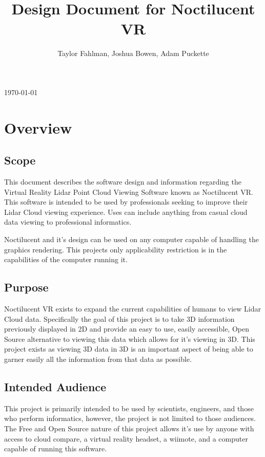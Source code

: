 \documentclass{article}
\begin{document}
\title {Design Document for Noctilucent VR}
\author {Taylor Fahlman, Joshua Bowen, Adam Puckette}
\today

\maketitle

\abstract

\newpage
\thispagestyle{empty}

\tableofcontents

\newpage
\thispagestyle{empty}
\mbox{}

\section{Overview}
\subsection{Scope}

This document describes the software design and information regarding the Virtual Reality Lidar Point Cloud Viewing Software known as Noctilucent VR.
This software is intended to be used by professionals seeking to improve their Lidar Cloud viewing experience.
Uses can include anything from casual cloud data viewing to professional informatics.

Noctilucent and it's design can be used on any computer capable of handling the graphics rendering.
This projects only applicability restriction is in the capabilities of the computer running it.

\subsection{Purpose}

Noctilucent VR exists to expand the current capabilities of humans to view Lidar Cloud data.
Specifically the goal of this project is to take 3D information previously displayed in 2D and provide an easy to use, easily accessible, Open Source alternative to viewing this data which allows for it's viewing in 3D.
This project exists as viewing 3D data in 3D is an important aspect of being able to garner easily all the information from that data as possible.

\subsection{Intended Audience}

This project is primarily intended to be used by scientists, engineers, and those who perform informatics, however, the project is not limited to those audiences.
The Free and Open Source nature of this project allows it's use by anyone with access to cloud compare, a virtual reality headset, a wiimote, and a computer capable of running this software.
\end{document}
